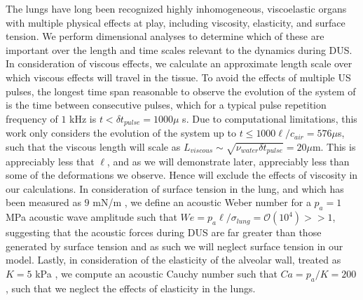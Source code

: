 \documentclass{article}
\newcommand{\orderof}[1]{\ensuremath{\mathcal{O}\left(#1\right)}}
\begin{document}
The lungs have long been recognized highly inhomogeneous, viscoelastic
organs \citep{Bayliss1939,Suki1994} with multiple physical effects at
play, including viscosity, elasticity, and surface tension. We perform
dimensional analyses to determine which of these are important over
the length and time scales relevant to the dynamics during
\ac{DUS}. In consideration of viscous effects, we calculate an
approximate length scale over which viscous effects will travel in the
tissue. To avoid the effects of multiple \ac{US} pulses, the longest
time span reasonable to observe the evolution of the system of is the
time between consecutive pulses, which for a typical pulse repetition
frequency of $1$ kHz is $t<\delta t_{pulse}=1000 \mu$ s. Due to
computational limitations, this work only considers the evolution of
the system up to $t\leq1000 \ell/c_{air}=576 \mu$s, such that the
viscous length will scale as
$L_{viscous}\sim\sqrt{\nu_{water} \delta t_{pulse}}=20 \mu$m. This is
appreciably less that $\ell$, and as we will demonstrate later,
appreciably less than some of the deformations we observe. Hence will
exclude the effects of viscosity in our calculations. In consideration
of surface tension in the lung, and which has been measured as $9$ mN/m
\citep{Schurch1976}, we define an acoustic Weber number for a
$p_a=1$ MPa acoustic wave amplitude such that
$We=p_a\ell/\sigma_{lung}=\orderof{10^4}>>1$, suggesting that the
acoustic forces during \ac{DUS} are far greater than those generated
by surface tension and as such we will neglect surface tension in our
model. Lastly, in consideration of the elasticity of the alveolar
wall, treated as $K = 5$ kPa \cite{Cavalcante2005}, we compute an
acoustic Cauchy number such that $Ca=p_a/K=200$, such that we neglect
the effects of elasticity in the lungs.
%
%
\end{document}
